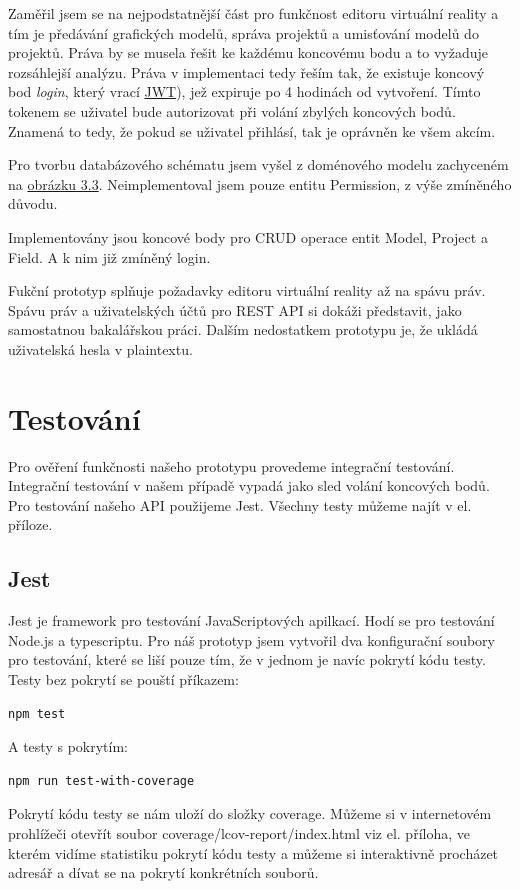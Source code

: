 \documentclass[thesis=B,czech]{FITthesis}[2012/06/26]
\begin{document}
		Zaměřil jsem se na nejpodstatnější část pro funkčnost editoru virtuální reality a tím je předávání grafických modelů, správa projektů a umisťování modelů do projektů.
		Práva by se musela řešit ke každému koncovému bodu a to vyžaduje rozsáhlejší analýzu. Práva v implementaci tedy řeším tak, že existuje koncový bod \textit{login}, který vrací \hyperref[jwt]{JWT}), jež expiruje po 4 hodinách od vytvoření. Tímto tokenem se uživatel bude autorizovat při volání zbylých koncových bodů.
		Znamená to tedy, že pokud se uživatel přihlásí, tak je oprávněn ke všem akcím.

        Pro tvorbu databázového schématu jsem vyšel z doménového modelu zachyceném na \hyperref[fig:domainModel]{obrázku 3.3}. Neimplementoval jsem pouze entitu Permission, z výše zmíněného důvodu.

        Implementovány jsou koncové body pro CRUD operace entit Model, Project a Field. A k nim již zmíněný login.
        
		
		Fukční prototyp splňuje požadavky editoru virtuální reality až na spávu práv.
		Spávu práv a uživatelských účtů pro REST API si dokáži představit, jako samostatnou bakalářskou práci.
		Dalším nedostatkem prototypu je, že ukládá uživatelská hesla v plaintextu.
\chapter{Testování}
    Pro ověření funkčnosti našeho prototypu provedeme integrační testování. Integrační testování v našem případě vypadá jako sled volání koncových bodů. Pro testování našeho API použijeme Jest. Všechny testy můžeme najít v el. příloze.

    \section{Jest}
        Jest je framework pro testování JavaScriptových apilkací. Hodí se pro testování Node.js a typescriptu.
        Pro náš prototyp jsem vytvořil dva konfigurační soubory pro testování, které se liší pouze tím, že v jednom je navíc pokrytí kódu testy. Testy bez pokrytí se pouští příkazem:
            \begin{verbatim}
npm test
            \end{verbatim}
        A testy s pokrytím:
            \begin{verbatim}
npm run test-with-coverage
            \end{verbatim}
        Pokrytí kódu testy se nám uloží do složky coverage. Můžeme si v internetovém prohlížeči otevřít soubor coverage/lcov-report/index.html viz el. příloha, ve kterém vidíme statistiku pokrytí kódu testy a můžeme si interaktivně procházet adresář a dívat se na pokrytí konkrétních souborů.
\end{document}

